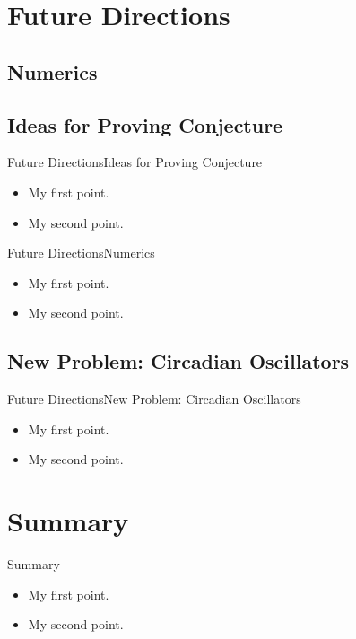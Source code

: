 \documentclass{beamer}
\begin{document}
\section{Future Directions}

\subsection{Numerics}

\subsection{Ideas for Proving Conjecture}

\begin{frame}{Future Directions}{Ideas for Proving Conjecture}
	\begin{itemize}
		\item {
			My first point.
		}
		\item {
			My second point.
		}
	\end{itemize}
\end{frame}

\begin{frame}{Future Directions}{Numerics}
	\begin{itemize}
		\item {
			My first point.
		}
		\item {
			My second point.
		}
	\end{itemize}
\end{frame}

\subsection{New Problem: Circadian Oscillators}

\begin{frame}{Future Directions}{New Problem: Circadian Oscillators}
	\begin{itemize}
		\item {
			My first point.
		}
		\item {
			My second point.
		}
	\end{itemize}
\end{frame}

\section*{Summary}
\begin{frame}{Summary}
	\begin{itemize}
		\item {
			My first point.
		}
		\item {
			My second point.
		}
	\end{itemize}
\end{frame}
\end{document}
